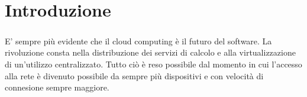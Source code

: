 \chapter{Introduzione}

\paragraph{}
 E' sempre più evidente che il cloud computing è il futuro del software. La rivoluzione consta nella distribuzione dei servizi di calcolo e alla virtualizzazione di un'utilizzo centralizzato. Tutto ciò è reso possibile dal momento in cui l'accesso alla rete è divenuto possibile da sempre più dispositivi e con velocità di connesione sempre maggiore.